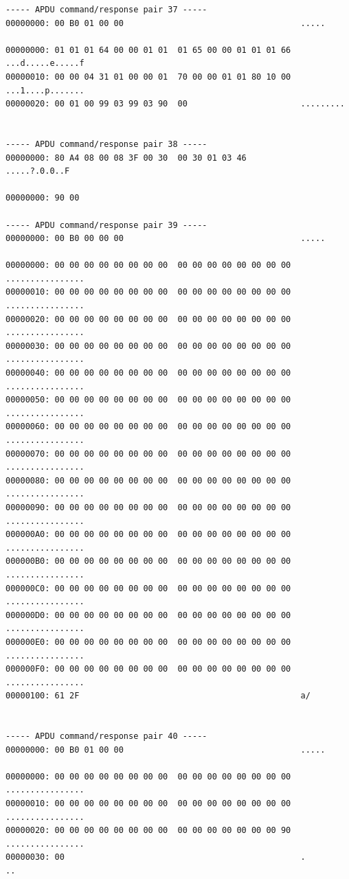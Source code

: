 \documentclass[bsc,frontabs,twoside,singlespacing,parskip,deptreport]{infthesis}     %
\begin{document}
\begin{appendices}
\begin{Verbatim}[commandchars=\\\{\}, fontsize=\small]
----- APDU command/response pair 37 -----
00000000: 00 B0 01 00 00                                    .....

00000000: 01 01 01 64 00 00 01 01  01 65 00 00 01 01 01 66  ...d.....e.....f
00000010: 00 00 04 31 01 00 00 01  70 00 00 01 01 80 10 00  ...1....p.......
00000020: 00 01 00 99 03 99 03 90  00                       .........


----- APDU command/response pair 38 -----
00000000: 80 A4 08 00 08 3F 00 30  00 30 01 03 46           .....?.0.0..F

00000000: 90 00      

----- APDU command/response pair 39 -----
00000000: 00 B0 00 00 00                                    .....

00000000: 00 00 00 00 00 00 00 00  00 00 00 00 00 00 00 00  ................
00000010: 00 00 00 00 00 00 00 00  00 00 00 00 00 00 00 00  ................
00000020: 00 00 00 00 00 00 00 00  00 00 00 00 00 00 00 00  ................
00000030: 00 00 00 00 00 00 00 00  00 00 00 00 00 00 00 00  ................
00000040: 00 00 00 00 00 00 00 00  00 00 00 00 00 00 00 00  ................
00000050: 00 00 00 00 00 00 00 00  00 00 00 00 00 00 00 00  ................
00000060: 00 00 00 00 00 00 00 00  00 00 00 00 00 00 00 00  ................
00000070: 00 00 00 00 00 00 00 00  00 00 00 00 00 00 00 00  ................
00000080: 00 00 00 00 00 00 00 00  00 00 00 00 00 00 00 00  ................
00000090: 00 00 00 00 00 00 00 00  00 00 00 00 00 00 00 00  ................
000000A0: 00 00 00 00 00 00 00 00  00 00 00 00 00 00 00 00  ................
000000B0: 00 00 00 00 00 00 00 00  00 00 00 00 00 00 00 00  ................
000000C0: 00 00 00 00 00 00 00 00  00 00 00 00 00 00 00 00  ................
000000D0: 00 00 00 00 00 00 00 00  00 00 00 00 00 00 00 00  ................
000000E0: 00 00 00 00 00 00 00 00  00 00 00 00 00 00 00 00  ................
000000F0: 00 00 00 00 00 00 00 00  00 00 00 00 00 00 00 00  ................
00000100: 61 2F                                             a/


----- APDU command/response pair 40 -----
00000000: 00 B0 01 00 00                                    .....

00000000: 00 00 00 00 00 00 00 00  00 00 00 00 00 00 00 00  ................
00000010: 00 00 00 00 00 00 00 00  00 00 00 00 00 00 00 00  ................
00000020: 00 00 00 00 00 00 00 00  00 00 00 00 00 00 00 90  ................
00000030: 00                                                .                                       ..
\end{Verbatim}


\end{appendices}
\end{document}
